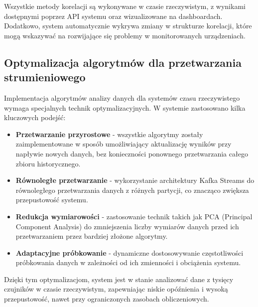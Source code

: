 Wszystkie metody korelacji są wykonywane w czasie rzeczywistym, z wynikami dostępnymi poprzez API systemu oraz wizualizowane na dashboardach. Dodatkowo, system automatycznie wykrywa zmiany w strukturze korelacji, które mogą wskazywać na rozwijające się problemy w monitorowanych urządzeniach.

\subsection{Optymalizacja algorytmów dla przetwarzania strumieniowego}
\label{subsec:optymalizacja_algorytmow}

Implementacja algorytmów analizy danych dla systemów czasu rzeczywistego wymaga specjalnych technik optymalizacyjnych. W systemie zastosowano kilka kluczowych podejść:

\begin{itemize}
    \item \textbf{Przetwarzanie przyrostowe} - wszystkie algorytmy zostały zaimplementowane w sposób umożliwiający aktualizację wyników przy napływie nowych danych, bez konieczności ponownego przetwarzania całego zbioru historycznego.
    \item \textbf{Równoległe przetwarzanie} - wykorzystanie architektury Kafka Streams do równoległego przetwarzania danych z różnych partycji, co znacząco zwiększa przepustowość systemu.
    \item \textbf{Redukcja wymiarowości} - zastosowanie technik takich jak PCA (Principal Component Analysis) do zmniejszenia liczby wymiarów danych przed ich przetwarzaniem przez bardziej złożone algorytmy.
    \item \textbf{Adaptacyjne próbkowanie} - dynamiczne dostosowywanie częstotliwości próbkowania danych w zależności od ich zmienności i obciążenia systemu.
\end{itemize}

Dzięki tym optymalizacjom, system jest w stanie analizować dane z tysięcy czujników w czasie rzeczywistym, zapewniając niskie opóźnienia i wysoką przepustowość, nawet przy ograniczonych zasobach obliczeniowych. 